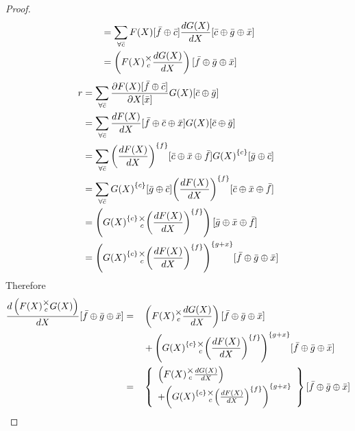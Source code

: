 \documentclass[12pt]{book}
\theoremstyle{plain}
\theoremstyle{definition}
\theoremstyle{ppart}
\theoremstyle{case}
\theoremstyle{solution}
\newcommand{\mmult}[1]{\text{\raisebox{1ex}{$\underset{#1}{\times}$}}}
\newcommand{\transpose}[2]{{#1}^{\{#2\}}}
\begin{document}
\begin{landscape}
\begin{proof}
\begin{align*}
 &=
  \sum_{\forall \bar{c}}
    F(X)[\bar{f} \oplus \bar{c}]
    \frac{dG(X)}{dX}[\bar{c} \oplus \bar{g} \oplus \bar{x}] \\
 &=
   \left( F(X) \mmult{c} \frac{dG(X)}{dX} \right)
   [\bar{f} \oplus \bar{g} \oplus \bar{x}]
\end{align*}
\begin{align*}
 r
 &=
  \sum_{\forall \bar{c}}
    \frac{\partial F(X)[\bar{f} \oplus \bar{c}]}{\partial X[\bar{x}]}
    G(X)[\bar{c} \oplus \bar{g}] \\
 &=
  \sum_{\forall \bar{c}}
    \frac{dF(X)}{dX}[\bar{f} \oplus \bar{c} \oplus \bar{x}]
    G(X)[\bar{c} \oplus \bar{g}] \\
 &=
  \sum_{\forall \bar{c}}
    \transpose{\left(\frac{dF(X)}{dX}\right)}{f}
      [\bar{c} \oplus \bar{x} \oplus \bar{f}]
    \transpose{G(X)}{c}[\bar{g} \oplus \bar{c}] \\
 &=
  \sum_{\forall \bar{c}}
    \transpose{G(X)}{c}[\bar{g} \oplus \bar{c}]
    \transpose{\left(\frac{dF(X)}{dX}\right)}{f}
      [\bar{c} \oplus \bar{x} \oplus \bar{f}] \\
 &=
  \left(
    \transpose{G(X)}{c} \mmult{c}
    \transpose{\left(\frac{dF(X)}{dX}\right)}{f}
  \right)[\bar{g} \oplus \bar{x} \oplus \bar{f}] \\
 &= 
  \transpose{\left(
    \transpose{G(X)}{c} \mmult{c}
    \transpose{\left(\frac{dF(X)}{dX}\right)}{f}
  \right)}{g+x}
  [\bar{f} \oplus \bar{g} \oplus \bar{x}]
\end{align*}
Therefore 
\begin{alignat*}{3}
 \frac{d\left(F(X) \mmult{c} G(X)\right)}{dX}
  [\bar{f} \oplus \bar{g} \oplus \bar{x}]
  &=&&
  \left( F(X) \mmult{c} \frac{dG(X)}{dX} \right)
  [\bar{f} \oplus \bar{g} \oplus \bar{x}] \\
  &&&+
  \transpose{\left(
    \transpose{G(X)}{c} \mmult{c}
    \transpose{\left(\frac{dF(X)}{dX}\right)}{f}
  \right)}{g+x}
  [\bar{f} \oplus \bar{g} \oplus \bar{x}] \\
  &=&&
  \left\{
    \begin{array}{l}
      \left( F(X) \mmult{c} \frac{dG(X)}{dX} \right) \\
      +
      \transpose{\left(
        \transpose{G(X)}{c} \mmult{c}
        \transpose{\left(\frac{dF(X)}{dX}\right)}{f}
      \right)}{g+x}
    \end{array}
  \right\}
  [\bar{f} \oplus \bar{g} \oplus \bar{x}]
\end{alignat*}
\end{proof}
\end{landscape}
\end{document}
